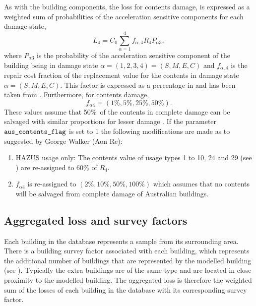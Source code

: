 As with the building components, the loss for contents damage, is
expressed as a weighted sum of probabilities of the acceleration
sensitive components for each damage state,
\begin{equation}
\label{eq:vlosses-contents}
 L_{4} = C_0 \sum_{\alpha=1}^{4} f_{\alpha,4}R_4P_{\alpha 3},
\end{equation}
where $P_{\alpha 3}$ is the probability of the acceleration
sensitive component of the building being in damage state
$\alpha=(1,2,3,4)=(S,M,E,C)$ and $f_{\alpha,4}$ is the repair cost
fraction of the replacement value for the contents in damage state
$\alpha=(S,M,E,C)$. This factor is expressed as a percentage in
 and has been taken from \citet[Table
15.6, page 15-21]{dr_FEMA99b}. Furthermore, for contents damage,
\begin{equation}
 f_{\alpha 4} = (1\%, 5\%, 25\%, 50\%).
\end{equation}
These values assume that 50\%\ of the contents in complete damage
can be salvaged with similar proportions for lesser damage
\citep{dr_FEMA99b}. If the  parameter
$\typepar{aus}{\_contents}{\_flag}$ is set to 1 the following
modifications are made as to suggested by George Walker (Aon Re):
\begin{enumerate}
\item HAZUS usage only: The contents
value of usage types 1 to 10, 24 and 29 (see
) are re-assigned to 60\% of $R_4$.
\item $f_{\alpha 4}$ is re-assigned to $(2\%, 10\%, 50\%, 100\%)$
which assumes that no contents will be salvaged from complete
damage of Australian buildings.
\end{enumerate}

\subsection{Aggregated loss and survey factors}
\label{sec:loss-surveyfacts}

Each building in the database represents a sample from its
surrounding area. There is a building survey factor associated
with each building, which represents the additional number of
buildings that are represented by the modelled building (see
). Typically the extra buildings
are of the same type and are located in close proximity to the
modelled building. The aggregated loss is therefore the weighted sum of the losses of
each building in the database with its corresponding survey factor.


